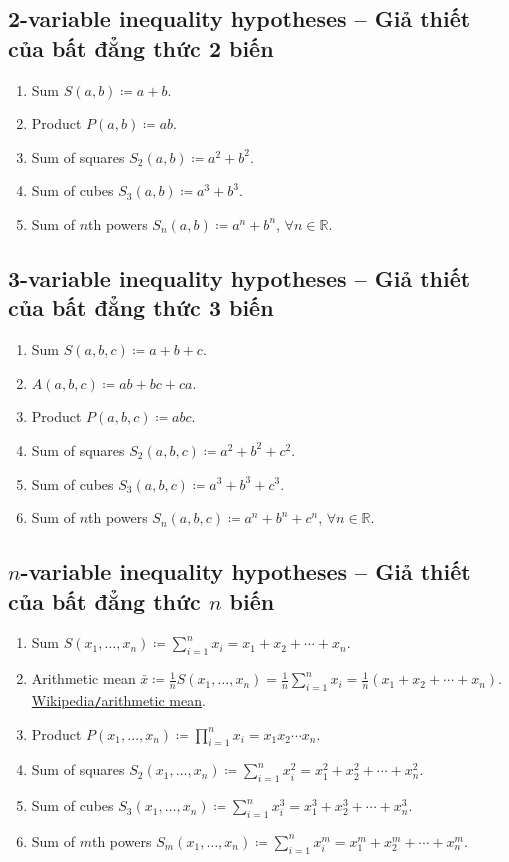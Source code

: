 \documentclass{article}
\begin{document}
\subsection{2-variable inequality hypotheses -- Giả thiết của bất đẳng thức 2 biến}

\begin{enumerate}
	\item Sum $S(a,b)\coloneqq a + b$.
	\item Product $P(a,b)\coloneqq ab$.
	\item Sum of squares $S_2(a,b)\coloneqq a^2 + b^2$.
	\item Sum of cubes $S_3(a,b)\coloneqq a^3 + b^3$.
	\item Sum of $n$th powers $S_n(a,b)\coloneqq a^n + b^n$, $\forall n\in\mathbb{R}$.
\end{enumerate}

\subsection{3-variable inequality hypotheses -- Giả thiết của bất đẳng thức 3 biến}

\begin{enumerate}
	\item Sum $S(a,b,c)\coloneqq a + b + c$.
	\item $A(a,b,c)\coloneqq ab + bc + ca$.
	\item Product $P(a,b,c)\coloneqq abc$.
	\item Sum of squares $S_2(a,b,c)\coloneqq a^2 + b^2 + c^2$.
	\item Sum of cubes $S_3(a,b,c)\coloneqq a^3 + b^3 + c^3$.
	\item Sum of $n$th powers $S_n(a,b,c)\coloneqq a^n + b^n + c^n$, $\forall n\in\mathbb{R}$.
\end{enumerate}

\subsection{$n$-variable inequality hypotheses -- Giả thiết của bất đẳng thức $n$ biến}

\begin{enumerate}
	\item Sum $S(x_1,\ldots,x_n)\coloneqq\sum_{i=1}^n x_i = x_1 + x_2 + \cdots + x_n$.
	\item Arithmetic mean $\bar{x}\coloneqq\frac{1}{n}S(x_1,\ldots,x_n) = \frac{1}{n}\sum_{i=1}^n x_i = \frac{1}{n}(x_1 + x_2 + \cdots + x_n)$. \href{https://en.wikipedia.org/wiki/Arithmetic_mean}{Wikipedia{\tt/}arithmetic mean}.
	\item Product $P(x_1,\ldots,x_n)\coloneqq\prod_{i=1}^n x_i = x_1x_2\cdots x_n$.
	\item Sum of squares $S_2(x_1,\ldots,x_n)\coloneqq\sum_{i=1}^n x_i^2 = x_1^2 + x_2^2 + \cdots + x_n^2$.
	\item Sum of cubes $S_3(x_1,\ldots,x_n)\coloneqq\sum_{i=1}^n x_i^3 = x_1^3 + x_2^3 + \cdots + x_n^3$.
	\item Sum of $m$th powers $S_m(x_1,\ldots,x_n)\coloneqq\sum_{i=1}^n x_i^m = x_1^m + x_2^m + \cdots + x_n^m$.
\end{enumerate}
\end{document}
